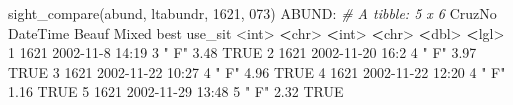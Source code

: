 \documentclass[
]{book}
\newenvironment{Shaded}{\begin{snugshade}}{\end{snugshade}}
\newcommand{\CommentTok}[1]{\textcolor[rgb]{0.56,0.35,0.01}{\textit{#1}}}
\newcommand{\ConstantTok}[1]{\textcolor[rgb]{0.00,0.00,0.00}{#1}}
\newcommand{\DecValTok}[1]{\textcolor[rgb]{0.00,0.00,0.81}{#1}}
\newcommand{\ErrorTok}[1]{\textcolor[rgb]{0.64,0.00,0.00}{\textbf{#1}}}
\newcommand{\FloatTok}[1]{\textcolor[rgb]{0.00,0.00,0.81}{#1}}
\newcommand{\FunctionTok}[1]{\textcolor[rgb]{0.00,0.00,0.00}{#1}}
\newcommand{\NormalTok}[1]{#1}
\newcommand{\SpecialCharTok}[1]{\textcolor[rgb]{0.00,0.00,0.00}{#1}}
\newcommand{\StringTok}[1]{\textcolor[rgb]{0.31,0.60,0.02}{#1}}
\begin{document}
\begin{Shaded}
\begin{Highlighting}[]
\FunctionTok{sight\_compare}\NormalTok{(abund, ltabundr, }\DecValTok{1621}\NormalTok{, }\StringTok{\textquotesingle{}073\textquotesingle{}}\NormalTok{)}
\NormalTok{ABUND}\SpecialCharTok{:}
\CommentTok{\# A tibble: 5 x 6}
\NormalTok{  CruzNo DateTime         Beauf Mixed  best use\_sit}
   \SpecialCharTok{\textless{}}\NormalTok{int}\SpecialCharTok{\textgreater{}} \ErrorTok{\textless{}}\NormalTok{chr}\SpecialCharTok{\textgreater{}}            \ErrorTok{\textless{}}\NormalTok{int}\SpecialCharTok{\textgreater{}} \ErrorTok{\textless{}}\NormalTok{chr}\SpecialCharTok{\textgreater{}} \ErrorTok{\textless{}}\NormalTok{dbl}\SpecialCharTok{\textgreater{}} \ErrorTok{\textless{}}\NormalTok{lgl}\SpecialCharTok{\textgreater{}}  
\DecValTok{1}   \DecValTok{1621} \DecValTok{2002{-}11{-}8} \DecValTok{14}\SpecialCharTok{:}\DecValTok{19}      \DecValTok{3} \StringTok{" F"}   \FloatTok{3.48} \ConstantTok{TRUE}   
\DecValTok{2}   \DecValTok{1621} \DecValTok{2002{-}11{-}20} \DecValTok{16}\SpecialCharTok{:}\DecValTok{2}      \DecValTok{4} \StringTok{" F"}   \FloatTok{3.97} \ConstantTok{TRUE}   
\DecValTok{3}   \DecValTok{1621} \DecValTok{2002{-}11{-}22} \DecValTok{10}\SpecialCharTok{:}\DecValTok{27}     \DecValTok{4} \StringTok{" F"}   \FloatTok{4.96} \ConstantTok{TRUE}   
\DecValTok{4}   \DecValTok{1621} \DecValTok{2002{-}11{-}22} \DecValTok{12}\SpecialCharTok{:}\DecValTok{20}     \DecValTok{4} \StringTok{" F"}   \FloatTok{1.16} \ConstantTok{TRUE}   
\DecValTok{5}   \DecValTok{1621} \DecValTok{2002{-}11{-}29} \DecValTok{13}\SpecialCharTok{:}\DecValTok{48}     \DecValTok{5} \StringTok{" F"}   \FloatTok{2.32} \ConstantTok{TRUE}   


\end{Highlighting}
\end{Shaded}
\end{document}
